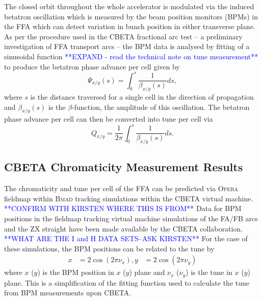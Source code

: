 \documentclass[../main.tex]{subfiles}
\begin{document}
The closed orbit throughout the whole accelerator is modulated via the induced betatron oscillation which is measured by the beam position monitors (BPMs) in the FFA which can detect variation in bunch position in either transverse plane. As per the procedure used in the CBETA fractional arc test \cite{gulliford2019beam} -- a preliminary investigation of FFA transport arcs -- the BPM data is analysed by fitting of a sinusoidal function \textcolor{blue}{**EXPAND - read the technical note on tune measurement**} to produce the betatron phase advance per cell given by
\begin{equation}
\Psi_{x/y}\left(s\right) = \int_{0}^{s}\frac{1}{\beta_{x/y}\left(s\right)}ds,
\label{eq:betatron_phase_advance_per_cell}
\end{equation}
where $s$ is the distance traversed for a single cell in the direction of propagation and $\beta_{x/y}\left(s\right)$ is the $\beta$-function, the amplitude of this oscillation. The betatron phase advance per cell can then be converted into tune per cell via 
\begin{equation}
Q_{x/y} = \frac{1}{2\pi}\int_{0}^{s} \frac{1}{\beta_{x/y}\left(s\right)}ds.
\label{eq:tune_definition}
\end{equation}

\subsection{CBETA Chromaticity Measurement Results}
\label{sec:CBETA_chromaticity_measurement_results}

The chromaticity and tune per cell of the FFA can be predicted via \textsc{Opera} fieldmap within \textsc{Bmad} tracking simulations within the CBETA virtual machine. \textcolor{blue}{**CONFIRM WITH KIRSTEN WHERE THIS IS FROM**} Data for BPM positions in the fieldmap tracking virtual machine simulations of the FA/FB arcs and the ZX straight have been made available by the CBETA collaboration. \textcolor{blue}{**WHAT ARE THE I and H DATA SETS--ASK KIRSTEN**} For the case of these simulations, the BPM positions can be related to the tune by 
\begin{align}
x &= 2\cos\left(2\pi\nu_{x}\right),
y &= 2\cos\left(2\pi\nu_{y}\right)
\label{eq:bpm_tune_conversion_fieldmap}
\end{align}
where $x$ ($y$) is the BPM position in $x$ ($y$) plane and $\nu_{x}$ ($\nu_{y}$) is the tune in $x$ ($y$) plane. This is a simplification of the fitting function \cite{gulliford2019beam} used to calculate the tune from BPM measurements upon CBETA.
\end{document}
